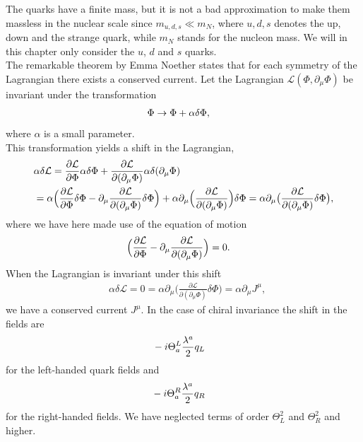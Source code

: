 The quarks have a finite mass, but it is not a bad approximation to make them massless
in the nuclear scale since $m_{u,d,s} \ll m_N$, where $u,d,s$ denotes the 
up, down and the strange quark, while $m_N$ stands for the nucleon mass. We will in this chapter only consider the $u$, $d$ and $s$ quarks.\\ 
The remarkable theorem by Emma Noether states that for each symmetry of
the Lagrangian there exists a conserved current.
Let the Lagrangian $\mathcal L(\Phi,\partial_\mu \Phi)$ be invariant under the transformation
\begin{align}
		&    \Phi \rightarrow  \Phi + \alpha\delta  \Phi, \notag
\end{align}
where $\alpha$ is a small parameter.\\
This transformation yields a shift in the Lagrangian,
\begin{align}
		&\alpha\delta \mathcal L=\frac{\partial\mathcal L}{\partial \Phi}\alpha\delta\Phi +\frac{\partial \mathcal L}{\partial(\partial_\mu\Phi)}\alpha\delta(\partial_\mu\Phi)\notag\\
		&= \alpha\Big(\frac{\partial\mathcal L}{\partial \Phi}\delta\Phi-\partial_\mu\frac{\partial \mathcal L}{\partial(\partial_\mu\Phi)}\delta\Phi\Big)+\alpha\partial_\mu\Big(\frac{\partial\mathcal L}{\partial(\partial_\mu\Phi)}\Big)\delta\Phi=\alpha\partial_\mu\big(\frac{\partial\mathcal L}{\partial(\partial_\mu\Phi)}\delta\Phi\big),
		\label{eq:shiftlag}
\end{align}
where we have here made use of the equation of motion 
\begin{align}
	&\Big(\frac{\partial\mathcal L}{\partial \Phi}-\partial_\mu\frac{\partial \mathcal L}{\partial(\partial_\mu\Phi)}\Big)=0.\notag	
\end{align}
When the Lagrangian is invariant under this shift
\begin{align}
	&	\alpha\delta\mathcal L=0=\alpha\partial_\mu\big(\frac{\partial\mathcal L}{\partial(\partial_\mu\Phi)}\delta\Phi\big)=\alpha\partial_\mu J^\mu,
		\label{eq:current}
\end{align}
we have a conserved current $J^\mu$.
In the case of chiral 
invariance the shift in the fields are
\begin{align}
	&	-i\Theta^L_a\frac{\lambda^a}{2}q_L\notag
\end{align}
for the left-handed quark fields and
\begin{align}
	&	-i\Theta^R_a\frac{\lambda^a}{2}q_R\notag
\end{align}
for the right-handed fields. We have neglected terms of order $\Theta_L^2$ and $\Theta_R^2$ and higher.
